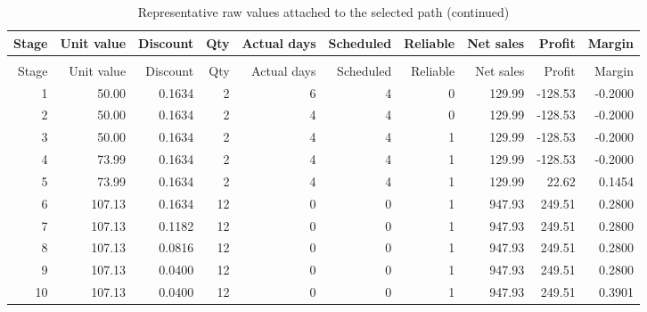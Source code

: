 \begingroup\small\setlength{\tabcolsep}{3pt}
\begin{longtable}{@{}rrrrrrrrrr@{}}
\caption{Representative raw values attached to the selected path}\label{tab:s10}\\
\toprule
Stage & Unit value & Discount & Qty & Actual days & Scheduled & Reliable & Net sales & Profit & Margin\\
\midrule
\endfirsthead
\caption[]{Representative raw values attached to the selected path (continued)}\\
\toprule
Stage & Unit value & Discount & Qty & Actual days & Scheduled & Reliable & Net sales & Profit & Margin\\
\midrule
\endhead
1 & 50.00 & 0.1634 & 2 & 6 & 4 & 0 & 129.99 & -128.53 & -0.2000\\
2 & 50.00 & 0.1634 & 2 & 4 & 4 & 0 & 129.99 & -128.53 & -0.2000\\
3 & 50.00 & 0.1634 & 2 & 4 & 4 & 1 & 129.99 & -128.53 & -0.2000\\
4 & 73.99 & 0.1634 & 2 & 4 & 4 & 1 & 129.99 & -128.53 & -0.2000\\
5 & 73.99 & 0.1634 & 2 & 4 & 4 & 1 & 129.99 & 22.62 & 0.1454\\
6 & 107.13 & 0.1634 & 12 & 0 & 0 & 1 & 947.93 & 249.51 & 0.2800\\
7 & 107.13 & 0.1182 & 12 & 0 & 0 & 1 & 947.93 & 249.51 & 0.2800\\
8 & 107.13 & 0.0816 & 12 & 0 & 0 & 1 & 947.93 & 249.51 & 0.2800\\
9 & 107.13 & 0.0400 & 12 & 0 & 0 & 1 & 947.93 & 249.51 & 0.2800\\
10 & 107.13 & 0.0400 & 12 & 0 & 0 & 1 & 947.93 & 249.51 & 0.3901\\
\bottomrule
\end{longtable}
\endgroup
